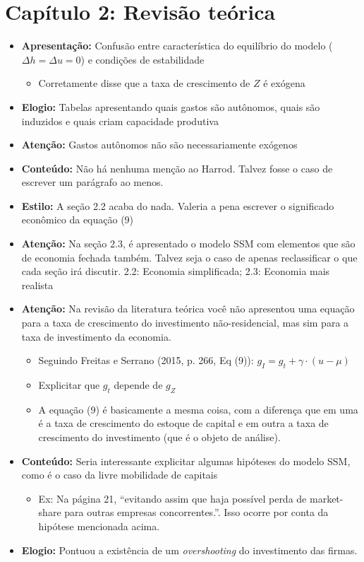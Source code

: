 \documentclass[11pt]{article}
\begin{document}
\section{Capítulo 2: Revisão teórica}
\label{sec:org3a439d7}
\begin{itemize}
\item \textbf{Apresentação:} Confusão entre característica do equilíbrio do modelo (\(\Delta h = \Delta u = 0\)) e condições de estabilidade
\begin{itemize}
\item Corretamente disse que a taxa de crescimento de \(Z\) é exógena
\end{itemize}
\item \textbf{Elogio:} Tabelas apresentando quais gastos são autônomos, quais são induzidos e quais criam capacidade produtiva
\item \textbf{Atenção:} Gastos autônomos não são necessariamente exógenos
\item \textbf{Conteúdo:} Não há nenhuma menção ao Harrod. Talvez fosse o caso de escrever um parágrafo ao menos.
\item \textbf{Estilo:} A seção 2.2 acaba do nada. Valeria a pena escrever o significado econômico da equação (9)
\item \textbf{Atenção:} Na seção 2.3, é apresentado o modelo SSM com elementos que são de economia fechada também. Talvez seja o caso de apenas reclassificar o que cada seção irá discutir. 2.2: Economia simplificada; 2.3: Economia mais realista
\item \textbf{Atenção:} Na revisão da literatura teórica você não apresentou uma equação para a taxa de crescimento do investimento não-residencial, mas sim para a taxa de investimento da economia.
\begin{itemize}
\item Seguindo Freitas e Serrano (2015, p. 266, Eq (9)): \(g_I = g_t + \gamma\cdot (u-\mu)\)
\item Explicitar que \(g_t\) depende de \(g_Z\)
\item A equação (9) é basicamente a mesma coisa, com a diferença que em uma é a taxa de crescimento do estoque de capital e em outra a taxa de crescimento do investimento (que é o objeto de análise).
\end{itemize}
\item \textbf{Conteúdo:} Seria interessante explicitar algumas hipóteses do modelo SSM, como é o caso da livre mobilidade de capitais
\begin{itemize}
\item Ex: Na página 21, ``evitando assim que haja possível perda de market-share para outras empresas concorrentes.''. Isso ocorre por conta da hipótese mencionada acima.
\end{itemize}
\item \textbf{Elogio:} Pontuou a existência de um \emph{overshooting} do investimento das firmas.
\end{itemize}
\end{document}
